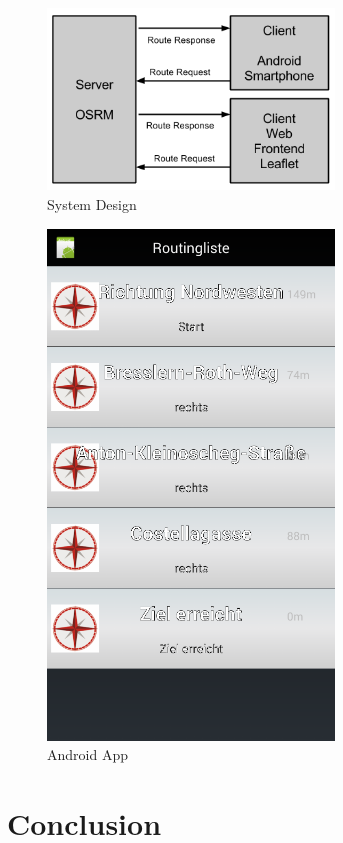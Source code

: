 \documentclass{sig-alternate}
\begin{document}
 

\begin{figure}
\centering
\includegraphics[width=3in]{System-Design2.png}
\caption{System Design}
\end{figure}

\begin{figure}
\centering
\includegraphics[width=3in]{App2.png}
\caption{Android App}
\label{fig:app}
\end{figure}


\section{Conclusion}
\end{document}
